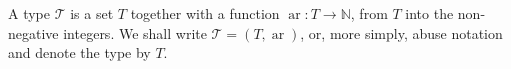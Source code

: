 A type $\mathcal{T}$ is a set $T$ together with a function $\operatorname{ar}: T \rightarrow \mathbb{N}$, from $T$ into the non-negative integers. We shall write $\mathcal{T} = (T, \operatorname{ar})$, or, more simply, abuse notation and denote the type by $T$.
